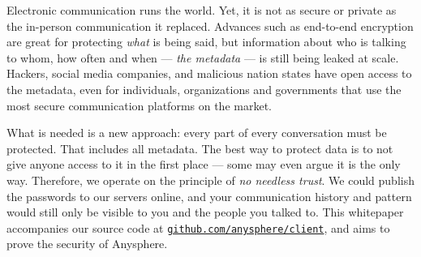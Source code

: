 





Electronic communication runs the world. Yet, it is not as secure or private as the in-person communication it replaced. Advances such as end-to-end encryption are great for protecting \textit{what} is being said, but information about who is talking to whom, how often and when — \textit{the metadata} — is still being leaked at scale. Hackers, social media companies, and malicious nation states have open access to the metadata, even for individuals, organizations and governments that use the most secure communication platforms on the market.

What is needed is a new approach: every part of every conversation must be protected. That includes all metadata. The best way to protect data is to not give anyone access to it in the first place — some may even argue it is the only way. Therefore, we operate on the principle of \textit{no needless trust}. We could publish the passwords to our servers online, and your communication history and pattern would still only be visible to you and the people you talked to. This whitepaper accompanies our source code at {\tt \href{https://github.com/anysphere/client}{github.com/anysphere/client}}, and aims to prove the security of Anysphere.